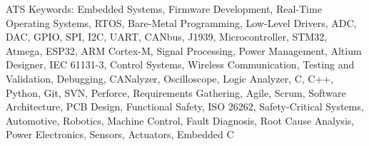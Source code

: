 \documentclass{article}
\begin{document}
\color{white}
\noindent
ATS Keywords: Embedded Systems, Firmware Development, Real-Time Operating Systems, RTOS, Bare-Metal Programming, Low-Level Drivers, ADC, DAC, GPIO, SPI, I2C, UART, CANbus, J1939, Microcontroller, STM32, Atmega, ESP32, ARM Cortex-M, Signal Processing, Power Management, Altium Designer, IEC 61131-3, Control Systems, Wireless Communication, Testing and Validation, Debugging, CANalyzer, Oscilloscope, Logic Analyzer, C, C++, Python, Git, SVN, Perforce, Requirements Gathering, Agile, Scrum, Software Architecture, PCB Design, Functional Safety, ISO 26262, Safety-Critical Systems, Automotive, Robotics, Machine Control, Fault Diagnosis, Root Cause Analysis, Power Electronics, Sensors, Actuators, Embedded C

\color{black}
\end{document}
